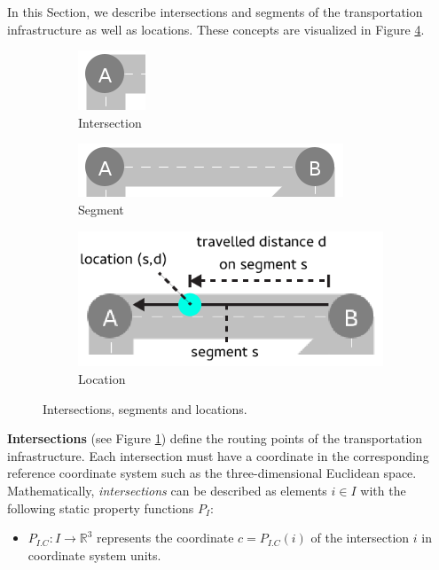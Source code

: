 \documentclass[graybox]{svmult}
\begin{document}
In this Section, we describe intersections and segments of the transportation infrastructure as well as locations. These concepts are visualized in Figure \ref{fig:intersections-segments}.

\begin{figure}[htbp]
	\centering
	\begin{subfigure}{.2\textwidth}
		\centering
		\includegraphics[scale=0.4]{../../concepts/intersection.png}
		\caption{Intersection}
		\label{fig:intersection}
	\end{subfigure}
	\begin{subfigure}{.35\textwidth}
		\centering
		\includegraphics[scale=0.4]{../../concepts/segment.png}
		\caption{Segment}
		\label{fig:segment}
	\end{subfigure}
	\begin{subfigure}{.35\textwidth}
		\centering
		\includegraphics[scale=0.4]{../../concepts/location.png}
		\caption{Location}
		\label{fig:location}
	\end{subfigure}
	\caption{Intersections, segments and locations.}
	\label{fig:intersections-segments}	
\end{figure}

\vspace{2mm}

\noindent \textbf{Intersections} (see Figure \ref{fig:intersection}) define the routing points of the transportation infrastructure.
Each intersection must have a coordinate in the corresponding reference coordinate system such as the three-dimensional Euclidean space.
Mathematically, \textit{intersections} can be described as elements $i \in I$ with the following static property functions $P_{I}$:
\begin{itemize}
	\item $P_{I.C}: I \rightarrow \mathbb{R}^3$ represents the coordinate $c = P_{I.C}(i)$ of the intersection $i$ in coordinate system units.
\end{itemize}
\end{document}
